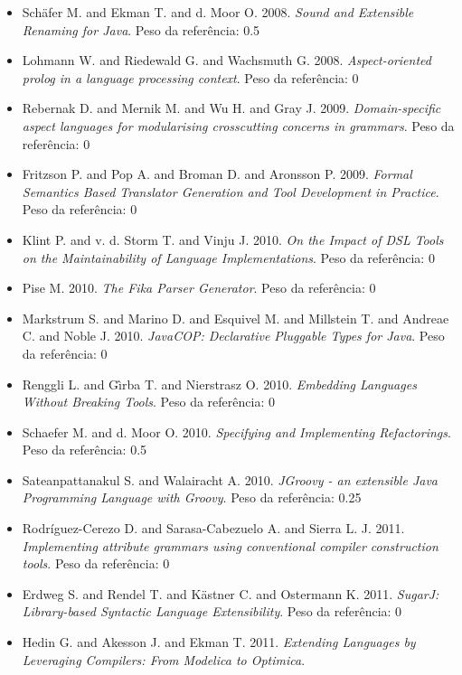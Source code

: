 \begin{itemize}
\item Sch\"{a}fer M. and Ekman T. and d. Moor O.
      2008.
      {\it Sound and Extensible Renaming for Java}.
      Peso da referência: 0.5
\item Lohmann W. and Riedewald G. and Wachsmuth G.
      2008.
      {\it Aspect-oriented prolog in a language processing context}.
      Peso da referência: 0
\item Rebernak D. and Mernik M. and Wu H. and Gray J.
      2009.
      {\it Domain-specific aspect languages for modularising crosscutting concerns in grammars}.
      Peso da referência: 0
\item Fritzson P. and Pop A. and Broman D. and Aronsson P.
      2009.
      {\it Formal Semantics Based Translator Generation and Tool Development in Practice}.
      Peso da referência: 0
\item Klint P. and v. d. Storm T. and Vinju J.
      2010.
      {\it On the Impact of DSL Tools on the Maintainability of Language Implementations}.
      Peso da referência: 0
\item Pise M.
      2010.
      {\it The Fika Parser Generator}.
      Peso da referência: 0
\item Markstrum S. and Marino D. and Esquivel M. and Millstein T. and Andreae C. and Noble J.
      2010.
      {\it JavaCOP: Declarative Pluggable Types for Java}.
      Peso da referência: 0
\item Renggli L. and G\^{\i}rba T. and Nierstrasz O.
      2010.
      {\it Embedding Languages Without Breaking Tools}.
      Peso da referência: 0
\item Schaefer M. and d. Moor O.
      2010.
      {\it Specifying and Implementing Refactorings}.
      Peso da referência: 0.5
\item Sateanpattanakul S. and Walairacht A.
      2010.
      {\it JGroovy - an extensible Java Programming Language with Groovy}.
      Peso da referência: 0.25
\item Rodríguez-Cerezo D. and Sarasa-Cabezuelo A. and Sierra L. J.
      2011.
      {\it Implementing attribute grammars using conventional compiler construction tools}.
      Peso da referência: 0
\item Erdweg S. and Rendel T. and K\"{a}stner C. and Ostermann K.
      2011.
      {\it SugarJ: Library-based Syntactic Language Extensibility}.
      Peso da referência: 0
\item Hedin G. and Akesson J. and Ekman T.
      2011.
      {\it Extending Languages by Leveraging Compilers: From Modelica to Optimica}.

\end{itemize}
